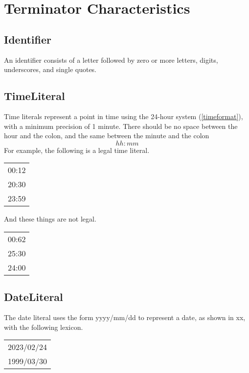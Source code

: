 \section{Terminator Characteristics}
\subsection{Identifier}\label{Identifier}
An identifier consists of a letter followed by zero or more letters, digits, underscores, and single quotes.
\begin{grammar}
    \emptyStm
        \orStm{\texttt{[0-9]}}
\end{grammar}

\subsection{TimeLiteral}\label{TimeLiteral}
Time literals represent a point in time using the 24-hour system (\ref{timeformat}), with a minimum precision of 1 minute.
There should be no space between the hour and the colon, and the same between the minute and the colon
\begin{equation}\label{timeformat}
    hh:mm
\end{equation}
For example, the following is a legal time literal.

\begin{center}
    \begin{tabular}{c}
        00:12 \\
        20:30 \\
        23:59 \\
    \end{tabular}
\end{center}
And these things are not legal.

\begin{center}
    \begin{tabular}{c}
        00:62 \\
        25:30 \\
        24:00 \\
    \end{tabular}
\end{center}
\begin{grammar}
\end{grammar}

\subsection{DateLiteral}\label{DateLiteral}
The date literal uses the form yyyy/mm/dd to represent a date, as shown in xx, with the following lexicon.
\begin{center}
    \begin{tabular}{c}
        2023/02/24 \\
        1999/03/30
    \end{tabular}
\end{center}

